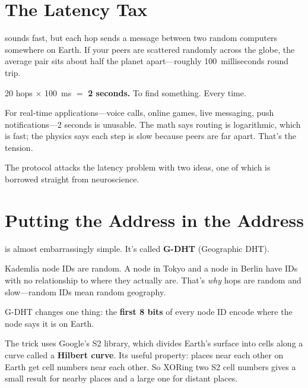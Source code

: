 \documentclass[nobib]{tufte-handout}
\begin{document}
\section{The Latency Tax}

 sounds fast, but each hop sends a message between two random computers somewhere on Earth. If your peers are scattered randomly across the globe, the average pair sits about half the planet apart---roughly 100~milliseconds round trip.

20 hops $\times$ 100~ms $=$ \textbf{2 seconds.} To find something. Every time.

For real-time applications---voice calls, online games, live messaging, push notifications---2 seconds is unusable. The math says routing is logarithmic, which is fast; the physics says each step is slow because peers are far apart. That's the tension.

The protocol attacks the latency problem with two ideas, one of which is borrowed straight from neuroscience.

\section{Putting the Address in the Address}

 is almost embarrassingly simple. It's called \textbf{G-DHT} (Geographic DHT).

Kademlia node IDs are random. A node in Tokyo and a node in Berlin have IDs with no relationship to where they actually are. That's \emph{why} hops are random and slow---random IDs mean random geography.

G-DHT changes one thing: the \textbf{first 8 bits} of every node ID encode where the node says it is on Earth.

The trick uses Google's S2 library, which divides Earth's surface into cells along a curve called a \textbf{Hilbert curve}. Its useful property: places near each other on Earth get cell numbers near each other. So XORing two S2 cell numbers gives a small result for nearby places and a large one for distant places.
\end{document}
